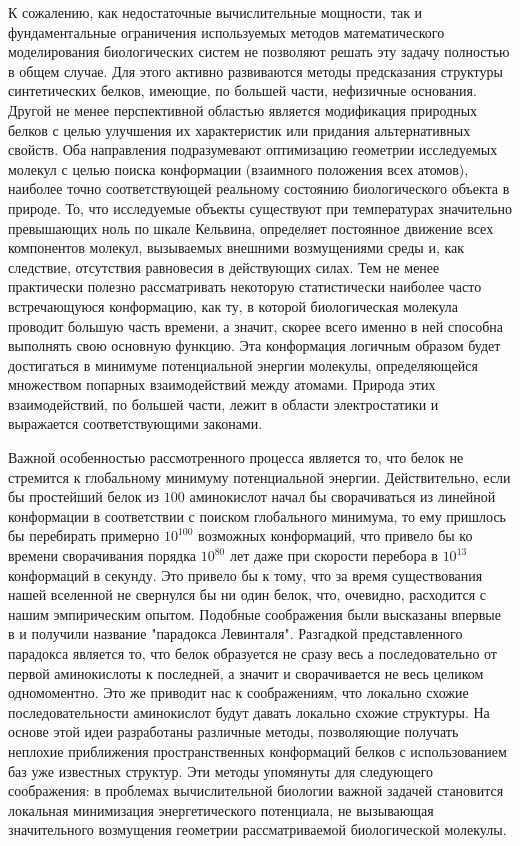   К сожалению, как недостаточные вычислительные мощности, так и фундаментальные ограничения используемых методов математического моделирования биологических систем не позволяют решать эту задачу полностью в общем случае.
  Для этого активно развиваются методы предсказания структуры синтетических белков, имеющие, по большей части, нефизичные основания.
  Другой не менее перспективной областью является модификация природных белков с целью улучшения их характеристик или придания альтернативных свойств.
  Оба направления подразумевают оптимизацию геометрии исследуемых молекул с целью поиска конформации (взаимного положения всех атомов), наиболее точно соответствующей реальному состоянию биологического объекта в природе.
  То, что исследуемые объекты существуют при температурах значительно превышающих ноль по шкале Кельвина, определяет постоянное движение всех компонентов молекул, вызываемых внешними возмущениями среды и, как следствие, отсутствия равновесия в действующих силах.
  Тем не менее практически полезно рассматривать некоторую статистически наиболее часто встречающуюся конформацию, как ту, в которой биологическая молекула проводит большую часть времени, а значит, скорее всего именно в ней способна выполнять свою основную функцию.
  Эта конформация логичным образом будет достигаться в минимуме потенциальной энергии молекулы, определяющейся множеством попарных взаимодействий между атомами.
  Природа этих взаимодействий, по большей части, лежит в области электростатики и выражается соответствующими законами.

  Важной особенностью рассмотренного процесса является то, что белок не стремится к глобальному минимуму потенциальной энергии.
  Действительно, если бы простейший белок из $100$ аминокислот начал бы сворачиваться из линейной конформации в соответствии с поиском глобального минимума, то ему пришлось бы перебирать примерно $10^{100}$ возможных конформаций, что привело бы ко времени сворачивания порядка $10^{80}$ лет даже при скорости перебора в $10^{13}$ конформаций в секунду.
  Это привело бы к тому, что за время существования нашей вселенной не свернулся бы ни один белок, что, очевидно, расходится с нашим эмпирическим опытом.
  Подобные соображения были высказаны впервые в \cite{levinthal1969} и получили название "парадокса Левинталя".
  Разгадкой представленного парадокса является то, что белок образуется не сразу весь а последовательно от первой аминокислоты к последней, а значит и сворачивается не весь целиком одномоментно.
  Это же приводит нас к соображениям, что локально схожие последовательности аминокислот будут давать локально схожие структуры.
  На основе этой идеи разработаны различные методы, позволяющие получать неплохие приближения пространственных конформаций белков с использованием баз уже известных структур.
  Эти методы упомянуты для следующего соображения: в проблемах вычислительной биологии важной задачей становится локальная минимизация энергетического потенциала, не вызывающая значительного возмущения геометрии рассматриваемой биологической молекулы.

